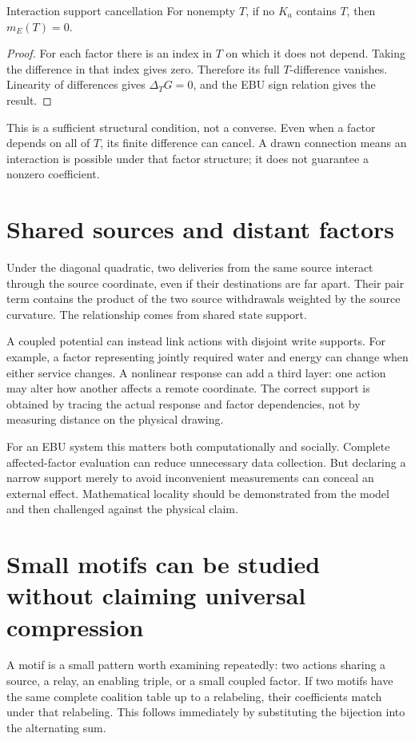\begin{theorem}{Interaction support cancellation}\label{thm:support}
For nonempty $T$, if no $K_a$ contains $T$, then $m_E(T)=0$.
\end{theorem}
\begin{proof}
For each factor there is an index in $T$ on which it does not depend. Taking the difference in that index gives zero. Therefore its full $T$-difference vanishes. Linearity of differences gives $\Delta_TG=0$, and the EBU sign relation gives the result.
\end{proof}

This is a sufficient structural condition, not a converse. Even when a factor depends on all of $T$, its finite difference can cancel. A drawn connection means an interaction is possible under that factor structure; it does not guarantee a nonzero coefficient.

\section{Shared sources and distant factors}
Under the diagonal quadratic, two deliveries from the same source interact through the source coordinate, even if their destinations are far apart. Their pair term contains the product of the two source withdrawals weighted by the source curvature. The relationship comes from shared state support.

A coupled potential can instead link actions with disjoint write supports. For example, a factor representing jointly required water and energy can change when either service changes. A nonlinear response can add a third layer: one action may alter how another affects a remote coordinate. The correct support is obtained by tracing the actual response and factor dependencies, not by measuring distance on the physical drawing.

For an EBU system this matters both computationally and socially. Complete affected-factor evaluation can reduce unnecessary data collection. But declaring a narrow support merely to avoid inconvenient measurements can conceal an external effect. Mathematical locality should be demonstrated from the model and then challenged against the physical claim.

\section{Small motifs can be studied without claiming universal compression}
A motif is a small pattern worth examining repeatedly: two actions sharing a source, a relay, an enabling triple, or a small coupled factor. If two motifs have the same complete coalition table up to a relabeling, their coefficients match under that relabeling. This follows immediately by substituting the bijection into the alternating sum.

